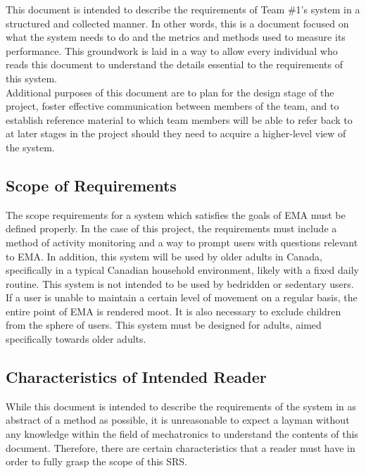 \documentclass[12pt]{article}
\begin{document}
This document is intended to describe the requirements of Team \#1's system in a structured and collected manner. In other words, this is a document focused on what the system needs to do and the metrics and methods used to measure its performance. This groundwork is laid in a way to allow every individual who reads this document to understand the details essential to the requirements of this system.\\

Additional purposes of this document are to plan for the design stage of the project, foster effective communication between members of the team, and to establish reference material to which team members will be able to refer back to at later stages in the project should they need to acquire a higher-level view of the system.

\subsection{Scope of Requirements}

The scope requirements for a system which satisfies the goals of EMA must be defined properly. In the case of this project, the requirements must include a method of activity monitoring and a way to prompt users with questions relevant to EMA. In addition, this system will be used by older adults in Canada, specifically in a typical Canadian household environment, likely with a fixed daily routine. This system is not intended to be used by bedridden or sedentary users. If a user is unable to maintain a certain level of movement on a regular basis, the entire point of EMA is rendered moot. It is also necessary to exclude children from the sphere of users. This system must be designed for adults, aimed specifically towards older adults.\\

\subsection{Characteristics of Intended Reader} \label{sec_IntendedReader}

While this document is intended to describe the requirements of the system in as abstract of a method as possible, it is unreasonable to expect a layman without any knowledge within the field of mechatronics to understand the contents of this document. Therefore, there are certain characteristics that a reader must have in order to fully grasp the scope of this SRS. \\
\end{document}
